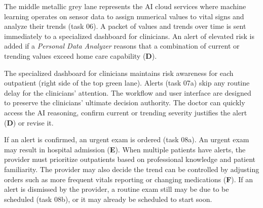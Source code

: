 The middle metallic grey lane represents the AI cloud services where machine learning operates on sensor data to assign numerical values to vital signs and analyze their trends (task 06). A packet of values and trends over time is sent immediately to a specialized dashboard for clinicians. An alert of elevated risk is added if a \emph{Personal Data Analyzer} reasons that a combination of current or trending values exceed home care capability (\textbf{D}).
    
The specialized dashboard for clinicians maintains risk awareness for each outpatient (right side of the top green lane). Alerts (task 07a) skip any routine delay for the clinicians' attention. The workflow and user interface are designed to preserve the clinicians' ultimate decision authority. The doctor can quickly access the AI reasoning, confirm current or trending severity justifies the alert (\textbf{D}) or revise it.

If an alert is confirmed, an urgent exam is ordered (task 08a). An urgent
exam may result in hospital admission (\textbf{E}). When multiple patients have alerts,
the provider must prioritize outpatients based on professional knowledge and
patient familiarity. The provider may also decide the trend can be controlled by
adjusting orders such as more frequent vitals reporting or changing medications
(\textbf{F}). If an alert is dismissed by the provider, a routine exam still may be due to be scheduled (task 08b), or it may already be scheduled to start soon.

\begin{comment}
The middle metallic grey lane represents the AI cloud services where a personal data analyzer operates on the data (task 06).  The analyzer immediately sends a packet to the clinician dashboard with vital signs and trends. An alert is added if predicted trends exceed home care capability or allowed severity in home care.

The specialized dashboard for clinicians maintains risk awareness for each outpatient (right side of the top green lane). Alerts (task 07a) skip any routine delay for the clinicians' attention. The workflow is designed to preserve the clinicians' ultimate decision authority. The AI can reason that risk is elevated if it determines trending severity is greater than the home care capability, and the provider can question the reasoning, and then confirm the alert or revise it. 

If an alert is confirmed, an urgent exam is ordered (task 08a). An urgent exam may result in hospital admission (\textbf{E}). When multiple patients have alerts, the provider must prioritize outpatients based on professional knowledge and patient familiarity. The provider may also decide the trend can be controlled by adjusting orders such as more frequent vitals reporting or changing medications (\textbf{F}). If an alert is dismissed by the provider, a routine exam still may be due to be scheduled (task 08b), or it may already be scheduled to start soon. 
\end{comment}

